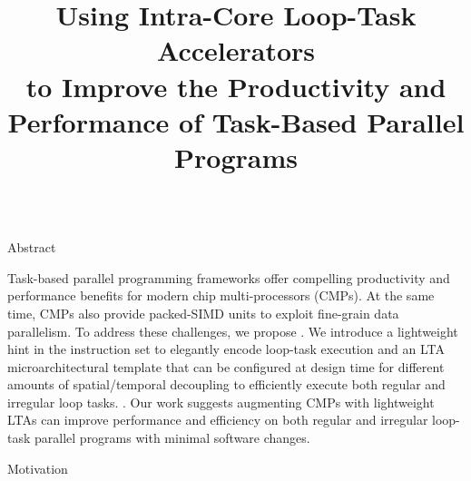 \documentclass{cbxposter}
\title
{%
  Using Intra-Core Loop-Task Accelerators \\
  to Improve the Productivity and Performance
  of Task-Based Parallel Programs
}
\begin{document}
\begin{frame}[fragile,t]{}
\vspace{0.57in}
\begin{columns}[T]


\begin{column}{10.5in}


\begin{block}{Abstract}

  Task-based parallel programming frameworks offer compelling productivity
  and performance benefits for modern chip multi-processors (CMPs). At the
  same time, CMPs also provide packed-SIMD units to exploit fine-grain
  data parallelism.  To address these challenges, we propose . We introduce a
  lightweight hint in the instruction set to elegantly encode loop-task
  execution and an LTA microarchitectural template that can be configured
  at design time for different amounts of spatial/temporal decoupling to
  efficiently execute both regular and irregular loop tasks. . Our work suggests augmenting CMPs with
  lightweight LTAs can improve performance and efficiency on both regular
  and irregular loop-task parallel programs with minimal software changes.

\end{block}


\vspace{0.81in}
\begin{block}{Motivation}


\end{block}
\end{column}
\end{columns}
\end{frame}
\end{document}
